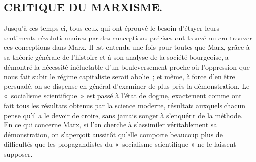 \documentclass[french,twoside]{book} %
\begin{document}
\subsection[{CRITIQUE DU MARXISME.}]{CRITIQUE DU MARXISME.}
\noindent Jusqu'à ces temps-ci, tous ceux qui ont éprouvé le besoin d'étayer leurs sentiments révolutionnaires par des conceptions précises ont trouvé ou cru trouver ces conceptions dans Marx. Il est entendu une fois pour toutes que Marx, grâce à sa théorie générale de l'histoire et à son analyse de la société bourgeoise, a démontré la nécessité inéluctable d'un bouleversement proche où l'oppression que nous fait subir le régime capitaliste serait abolie ; et même, à force d'en être persuadé, on se dispense en général d'examiner de plus près la démonstration. Le « socialisme scientifique » est passé à l'état de dogme, exactement comme ont fait tous les résultats obtenus par la science moderne, résultats auxquels chacun pense qu'il a le devoir de croire, sans jamais songer à s'enquérir de la méthode. En ce qui concerne Marx, si l'on cherche à s'assimiler véritablement sa démonstration, on s'aperçoit aussitôt qu'elle comporte beaucoup plus de difficultés que les propagandistes du « socialisme scientifique » ne le laissent supposer.\par
\end{document}
